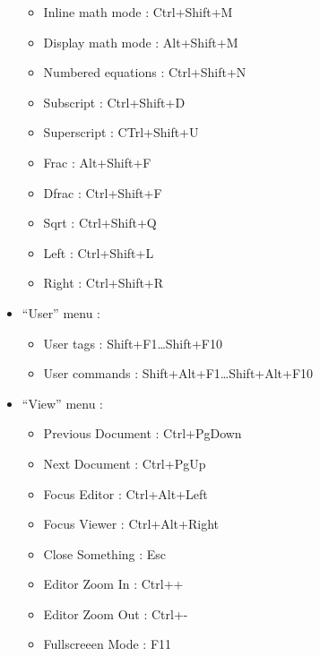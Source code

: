 \documentclass[10pt,legalpaper,twocolumn]{article}
\begin{document}
\begin{itemize}
  \begin{itemize}
  \itemsep1pt\parskip0pt
  \item
    Inline math mode : Ctrl+Shift+M
  \item
    Display math mode : Alt+Shift+M
  \item
    Numbered equations : Ctrl+Shift+N
  \item
    Subscript : Ctrl+Shift+D
  \item
    Superscript : CTrl+Shift+U
  \item
    Frac : Alt+Shift+F
  \item
    Dfrac : Ctrl+Shift+F
  \item
    Sqrt : Ctrl+Shift+Q
  \item
    Left : Ctrl+Shift+L
  \item
    Right : Ctrl+Shift+R
  \end{itemize}
\item
  ``User'' menu :

  \begin{itemize}
  \itemsep1pt\parskip0pt
  \item
    User tags : Shift+F1\ldots{}Shift+F10
  \item
    User commands : Shift+Alt+F1\ldots{}Shift+Alt+F10
  \end{itemize}
\item
  ``View'' menu :

  \begin{itemize}
  \itemsep1pt\parskip0pt
  \item
    Previous Document : Ctrl+PgDown
  \item
    Next Document : Ctrl+PgUp
  \item
    Focus Editor : Ctrl+Alt+Left
  \item
    Focus Viewer : Ctrl+Alt+Right
  \item
    Close Something : Esc
  \item
    Editor Zoom In : Ctrl++
  \item
    Editor Zoom Out : Ctrl+-
  \item
    Fullscreeen Mode : F11
  \end{itemize}
\end{itemize}
\end{document}

